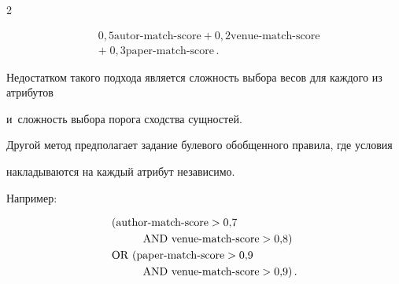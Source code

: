 \begin{multicols}{2}
  \vspace*{-4pt}



  \noindent

  \begin{align*}

 & 0{,}5  \mathrm{autor}\mbox{-}\mathrm{match}\mbox{-}\mathrm{score}+

  0{,}2\mathrm{venue}\mbox{-}\mathrm{match}\mbox{-}\mathrm{score}\\

&  +\;  0{,}3\mathrm{paper}\mbox{-}\mathrm{match}\mbox{-}\mathrm{score}\,.

  \end{align*}



  \vspace*{-4pt}



  Недостатком такого подхода является сложность выбора весов для каждого из атрибутов

и~сложность выбора порога сходства сущностей.



  Другой метод предполагает задание булевого обобщенного правила, где условия

накладываются на каждый атрибут независимо.



  Например:



  \vspace*{-4pt}



  \noindent

  \begin{align*}

&(\mathrm{author\mbox{-}match\mbox{-}score > 0{,}7}\\

&\hspace*{10mm}\mathrm{AND\ venue\mbox{-}match\mbox{-}score >0{,}8)}\\

  &\mathrm{OR\ (paper\mbox{-}match\mbox{-}score > 0{,}9}\\

&\hspace*{10mm}\mathrm{AND\

  venue\mbox{-}match\mbox{-}score>0{,}9)}\,.

  \end{align*}




\end{multicols}

